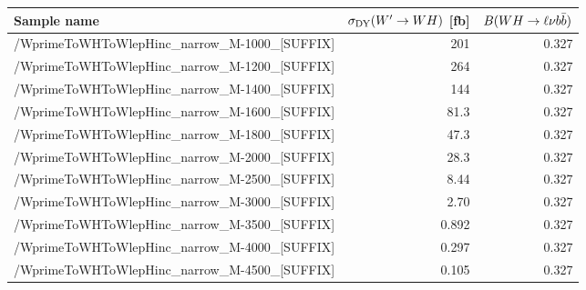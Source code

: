 \scriptsize
\begin{tabular}{lrr}
  \hline
  \textbf{Sample name} & $\sigma_{\mathrm{DY}}(W'\to WH)$ [fb] & $B(WH\to\ell\nu b\bar{b})$ \\
  \hline
  \ttfamily /WprimeToWHToWlepHinc\_narrow\_M-1000\_[SUFFIX] & 201 & 0.327  \\
  \ttfamily /WprimeToWHToWlepHinc\_narrow\_M-1200\_[SUFFIX] & 264 & 0.327  \\
  \ttfamily /WprimeToWHToWlepHinc\_narrow\_M-1400\_[SUFFIX] & 144 & 0.327  \\
  \ttfamily /WprimeToWHToWlepHinc\_narrow\_M-1600\_[SUFFIX] & 81.3 & 0.327  \\
  \ttfamily /WprimeToWHToWlepHinc\_narrow\_M-1800\_[SUFFIX] & 47.3 & 0.327  \\
  \ttfamily /WprimeToWHToWlepHinc\_narrow\_M-2000\_[SUFFIX] & 28.3 & 0.327  \\
  \ttfamily /WprimeToWHToWlepHinc\_narrow\_M-2500\_[SUFFIX] & 8.44 & 0.327  \\
  \ttfamily /WprimeToWHToWlepHinc\_narrow\_M-3000\_[SUFFIX] & 2.70 & 0.327  \\
  \ttfamily /WprimeToWHToWlepHinc\_narrow\_M-3500\_[SUFFIX] & 0.892 & 0.327  \\
  \ttfamily /WprimeToWHToWlepHinc\_narrow\_M-4000\_[SUFFIX] & 0.297 & 0.327  \\
  \ttfamily /WprimeToWHToWlepHinc\_narrow\_M-4500\_[SUFFIX] & 0.105 & 0.327  \\
  \hline
\end{tabular}
